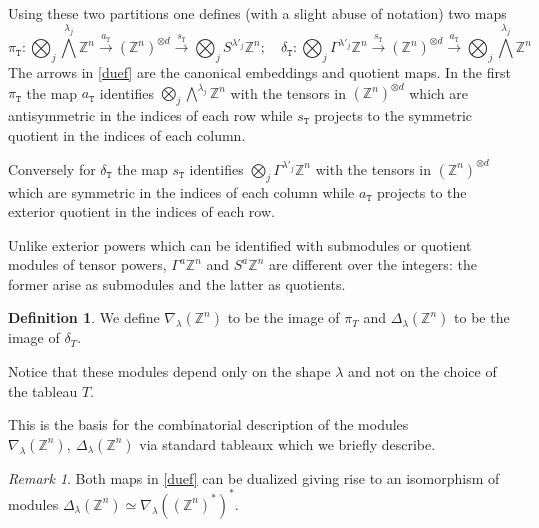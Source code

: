 \documentclass[10pt]{amsart}
\theoremstyle{definition}
\newtheorem{definition}[theorem]{Definition}
\theoremstyle{remark}
\newtheorem{remark}[theorem]{Remark}
\newcommand{\Z}{\mathbb Z}
\begin{document}
  Using these two partitions one defines (with a slight abuse of notation) two maps
\begin{equation}\label{duef}
\pi_{\mathtt T}:\bigotimes_j\bigwedge^{\lambda_j}\Z^n\stackrel{a_{\mathtt T}}\to (\Z^n)^{\otimes d}\stackrel{s_{\mathtt T}}\to \bigotimes_jS^{\lambda'_j}\Z^n;\quad \delta_{\mathtt T}:\bigotimes_j\Gamma^{\lambda'_j}\Z^n\stackrel{s_{\mathtt T}}\to (\Z^n)^{\otimes d}\stackrel{  a_{\mathtt T}}\to \bigotimes_j\bigwedge^{\lambda_j}\Z^n\,
\end{equation}
The arrows in \eqref{duef} are the canonical embeddings and quotient maps. In the first $\pi_{\mathtt T}$  the map $a_{\mathtt T}$  identifies $\bigotimes_j\bigwedge^{\lambda_j}\Z^n$ with the tensors in $(\Z^n)^{\otimes d}$  which are antisymmetric in the indices of each row  while $s_{\mathtt T}$  projects  to the symmetric quotient in the indices of each column.

Conversely  for $\delta_{\mathtt T}$  the map $s_{\mathtt T}$  identifies $\bigotimes_j\Gamma^{\lambda'_j}\Z^n$ with the tensors in $(\Z^n)^{\otimes d}$  which are  symmetric in the indices of each column  while $a_{\mathtt T}$  projects  to the exterior quotient in the indices of each row.
\smallskip

Unlike exterior powers which can be identified with submodules or quotient modules of  tensor powers,  $\Gamma^{a}\Z^n$ and $S^a\Z^n$  are different over the integers: the former arise as submodules  and the latter  as quotients.   
\begin{definition}\label{nabdel}
We define  $\nabla_\lambda(\Z^n)$ to be the image of  $\pi_T$ and  $\Delta_\lambda(\Z^n)$ to be the image of  $\delta_T$.
\end{definition}
Notice that  these modules depend only on the shape $\lambda$ and not on the choice of the tableau $T$.




This is the basis for the  combinatorial description   of the modules  $\nabla_\lambda(\Z^n),\ \Delta_\lambda(\Z^n)$ via standard tableaux which we briefly describe.

 \begin{remark}\label{duas}
Both maps in \eqref{duef} can be dualized  giving rise to an isomorphism of modules $\Delta_{\lambda}(\Z^n)\simeq \nabla_{\lambda}((\Z^n)^*)^*.$
\end{remark}

\medskip
\end{document}
